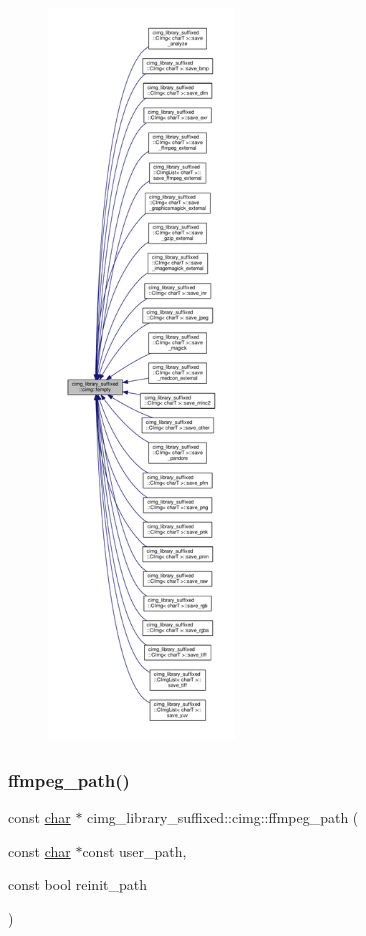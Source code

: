 \begin{figure}[H]
\begin{center}
\leavevmode
\includegraphics[height=550pt]{d4/d9b/namespacecimg__library__suffixed_1_1cimg_a0f3577978081461118330fc3ecd4b9db_icgraph}
\end{center}
\end{figure}
\mbox{\label{namespacecimg__library__suffixed_1_1cimg_a5b8fba26176c5506b1eb27e70ca44889}} 
\subsubsection{\texorpdfstring{ffmpeg\+\_\+path()}{ffmpeg\_path()}}
{\footnotesize\ttfamily const \hyperlink{classchar}{char} $\ast$ cimg\+\_\+library\+\_\+suffixed\+::cimg\+::ffmpeg\+\_\+path (\begin{DoxyParamCaption}\item[{const \hyperlink{classchar}{char} $\ast$const}]{user\+\_\+path,  }\item[{const bool}]{reinit\+\_\+path }\end{DoxyParamCaption})\hspace{0.3cm}{\ttfamily [inline]}}



